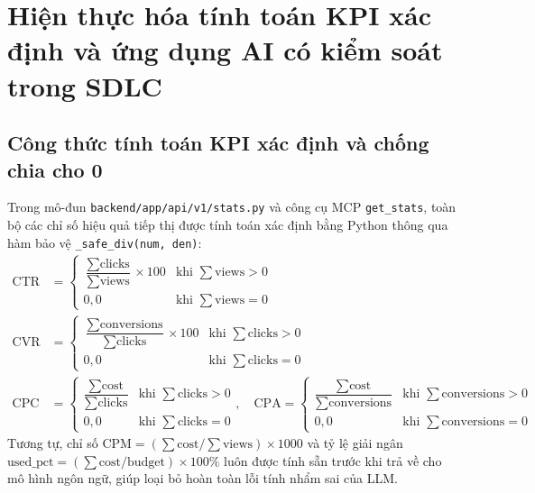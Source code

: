 \section{Hiện thực hóa tính toán KPI xác định và ứng dụng AI có kiểm soát trong SDLC}

\subsection{Công thức tính toán KPI xác định và chống chia cho 0}
Trong mô-đun \texttt{backend/app/api/v1/stats.py} và công cụ MCP \texttt{get\_stats}, toàn bộ các chỉ số hiệu quả tiếp thị được tính toán xác định bằng Python thông qua hàm bảo vệ \texttt{\_safe\_div(num, den)}:
\begin{align}
\text{CTR (\%)} &= \begin{cases} \dfrac{\sum \text{clicks}}{\sum \text{views}} \times 100 & \text{khi } \sum \text{views} > 0 \\ 0,0 & \text{khi } \sum \text{views} = 0 \end{cases} \\
\text{CVR (\%)} &= \begin{cases} \dfrac{\sum \text{conversions}}{\sum \text{clicks}} \times 100 & \text{khi } \sum \text{clicks} > 0 \\ 0,0 & \text{khi } \sum \text{clicks} = 0 \end{cases} \\
\text{CPC} &= \begin{cases} \dfrac{\sum \text{cost}}{\sum \text{clicks}} & \text{khi } \sum \text{clicks} > 0 \\ 0,0 & \text{khi } \sum \text{clicks} = 0 \end{cases}, \quad
\text{CPA} = \begin{cases} \dfrac{\sum \text{cost}}{\sum \text{conversions}} & \text{khi } \sum \text{conversions} > 0 \\ 0,0 & \text{khi } \sum \text{conversions} = 0 \end{cases}
\end{align}
Tương tự, chỉ số $\text{CPM} = (\sum \text{cost} / \sum \text{views}) \times 1000$ và tỷ lệ giải ngân $\text{used\_pct} = (\sum \text{cost} / \text{budget}) \times 100\%$ luôn được tính sẵn trước khi trả về cho mô hình ngôn ngữ, giúp loại bỏ hoàn toàn lỗi tính nhẩm sai của LLM.

